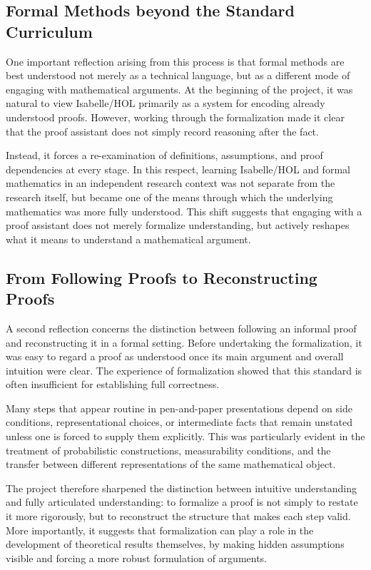 \subsection{Formal Methods beyond the Standard Curriculum}

One important reflection arising from this process is that formal methods are best understood not merely as a technical language, but as a different mode of engaging with mathematical arguments.
At the beginning of the project, it was natural to view Isabelle/HOL primarily as a system for encoding already understood proofs.
However, working through the formalization made it clear that the proof assistant does not simply record reasoning after the fact.

Instead, it forces a re-examination of definitions, assumptions, and proof dependencies at every stage.
In this respect, learning Isabelle/HOL and formal mathematics in an independent research context was not separate from the research itself, but became one of the means through which the underlying mathematics was more fully understood.
This shift suggests that engaging with a proof assistant does not merely formalize understanding, but actively reshapes what it means to understand a mathematical argument.

\subsection{From Following Proofs to Reconstructing Proofs}

A second reflection concerns the distinction between following an informal proof and reconstructing it in a formal setting.
Before undertaking the formalization, it was easy to regard a proof as understood once its main argument and overall intuition were clear.
The experience of formalization showed that this standard is often insufficient for establishing full correctness.

Many steps that appear routine in pen-and-paper presentations depend on side conditions, representational choices, or intermediate facts that remain unstated unless one is forced to supply them explicitly.
This was particularly evident in the treatment of probabilistic constructions, measurability conditions, and the transfer between different representations of the same mathematical object.

The project therefore sharpened the distinction between intuitive understanding and fully articulated understanding: to formalize a proof is not simply to restate it more rigorously, but to reconstruct the structure that makes each step valid.
More importantly, it suggests that formalization can play a role in the development of theoretical results themselves, by making hidden assumptions visible and forcing a more robust formulation of arguments.


